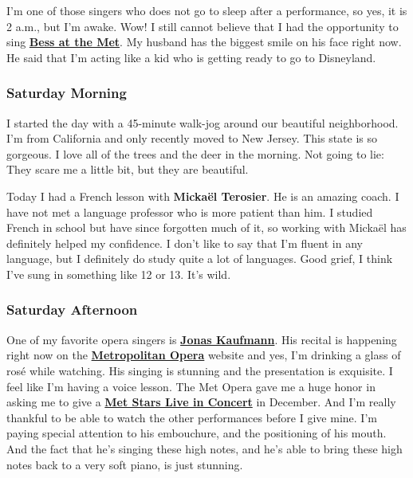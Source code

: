 I'm one of those singers who does not go to sleep after a performance,
so yes, it is 2 a.m., but I'm awake. Wow! I still cannot believe that I
had the opportunity to sing
\textbf{\href{https://www.metopera.org/user-information/old-seasons/2019-20/2019-20-season/porgy-and-bess/}{Bess
at the Met}}. My husband has the biggest smile on his face right now. He
said that I'm acting like a kid who is getting ready to go to
Disneyland.

\hypertarget{saturday-morning}{%
\subsubsection{\texorpdfstring{\textbf{Saturday
Morning}}{Saturday Morning}}\label{saturday-morning}}

I started the day with a 45-minute walk-jog around our beautiful
neighborhood. I'm from California and only recently moved to New Jersey.
This state is so gorgeous. I love all of the trees and the deer in the
morning. Not going to lie: They scare me a little bit, but they are
beautiful.

Today I had a French lesson with \textbf{Mickaël Terosier}. He is an
amazing coach. I have not met a language professor who is more patient
than him. I studied French in school but have since forgotten much of
it, so working with Mickaël has definitely helped my confidence. I don't
like to say that I'm fluent in any language, but I definitely do study
quite a lot of languages. Good grief, I think I've sung in something
like 12 or 13. It's wild.

\hypertarget{saturday-afternoon}{%
\subsubsection{\texorpdfstring{\textbf{Saturday
Afternoon}}{Saturday Afternoon}}\label{saturday-afternoon}}

One of my favorite opera singers is
\textbf{\href{https://www.metopera.org/?gclid=CjwKCAjwx9_4BRAHEiwApAt0zkpYv_d3Xrthz9UgNlY2F7wlAM2dnARcjeAm4vSDllKiwc7KEg262RoCvYUQAvD_BwE\&gclsrc=aw.ds}{Jonas
Kaufmann}}. His recital is happening right now on the
\textbf{\href{https://www.metopera.org/}{Metropolitan Opera}} website
and yes, I'm drinking a glass of rosé while watching. His singing is
stunning and the presentation is exquisite. I feel like I'm having a
voice lesson. The Met Opera gave me a huge honor in asking me to give a
\textbf{\href{https://metstarslive.brightcove-services.com/}{Met Stars
Live in Concert}} in December. And I'm really thankful to be able to
watch the other performances before I give mine. I'm paying special
attention to his embouchure, and the positioning of his mouth. And the
fact that he's singing these high notes, and he's able to bring these
high notes back to a very soft piano, is just stunning.

